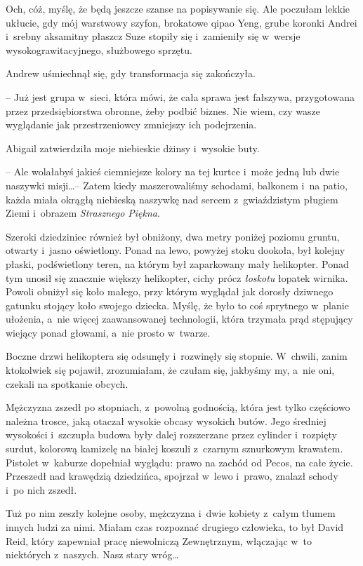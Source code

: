 \documentclass[oneside,polish,11pt,sfheadings]{mwbk}
\begin{document}
Och, cóż, myślę, że będą jeszcze szanse na popisywanie się. Ale poczułam
lekkie ukłucie, gdy mój warstwowy szyfon, brokatowe qipao Yeng, grube
koronki Andrei i~srebny aksamitny płaszcz Suze stopiły się i~zamieniły
się w~wersje wysokograwitacyjnego, służbowego sprzętu.

Andrew uśmiechnął się, gdy transformacja się zakończyła. 

-- Już jest
grupa w~sieci, która mówi, że cała sprawa jest fałszywa, przygotowana
przez przedsiębiorstwa obronne, żeby podbić biznes. Nie wiem, czy wasze
wyglądanie jak przestrzeniowcy zmniejszy ich podejrzenia.

Abigail zatwierdziła moje niebieskie dżinsy i~wysokie buty. 

-- Ale wolałabyś jakieś ciemniejsze kolory na tej kurtce i~może jedną lub dwie
naszywki misji\ldots  -- Zatem kiedy maszerowaliśmy schodami, balkonem i~na
patio, każda miała okrągłą niebieską naszywkę nad sercem z~gwiaździstym
pługiem Ziemi i~obrazem \textit{Strasznego Piękna}.

Szeroki dziedziniec również był obniżony, dwa metry poniżej poziomu
gruntu, otwarty i~jasno oświetlony. Ponad na lewo, powyżej stoku
dookoła, był kolejny płaski, podświetlony teren, na którym był
zaparkowany mały helikopter. Ponad tym unosił się znacznie większy
helikopter, cichy prócz \textit{łoskotu} łopatek wirnika. Powoli obniżył
się koło małego, przy którym wyglądał jak dorosły dziwnego gatunku
stojący koło swojego dziecka. Myślę, że było to coś sprytnego w~planie
ułożenia, a~nie więcej zaawansowanej technologii, która trzymała prąd
stępujący wiejący ponad głowami, a~nie prosto w~twarze.

Boczne drzwi helikoptera się odsunęły i~rozwinęły się stopnie. W~chwili,
zanim ktokolwiek się pojawił, zrozumiałam, że czułam się, jakbyśmy my, a~nie oni, czekali na spotkanie obcych.

Mężczyzna zszedł po stopniach, z~powolną godnością, która jest tylko
częściowo należna trosce, jaką otaczał wysokie obcasy wysokich butów.
Jego średniej wysokości i~szczupła budowa były dalej rozszerzane przez
cylinder i~rozpięty surdut, kolorową kamizelę na białej koszuli z~czarnym sznurkowym krawatem. Pistolet w~kaburze dopełniał wyglądu: prawo
na zachód od Pecos, na całe życie. Przeszedł nad krawędzią dziedzińca,
spojrzał w~lewo i~prawo, znalazł schody i~po nich zszedł.

Tuż po nim zeszły kolejne osoby, mężczyzna i~dwie kobiety z~całym tłumem
innych ludzi za nimi. Miałam czas rozpoznać drugiego człowieka, to był
David Reid, który zapewniał pracę niewolniczą Zewnętrznym, włączając w~to niektórych z~naszych. Nasz stary wróg\ldots 
\end{document}
